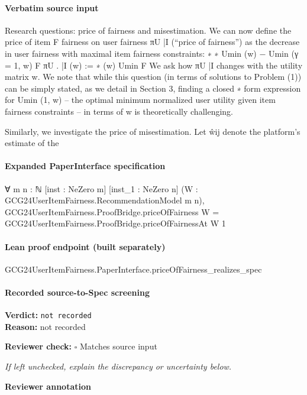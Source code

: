 \documentclass[10pt]{article}
\newcommand{\reviewerbox}{%
  \par\noindent\fbox{\parbox{0.96\linewidth}{\rule{0pt}{0.38in}}}\par
}
\newcommand{\reviewmatch}[1]{%
  \par\noindent\textbf{Reviewer check:} $\square$\; #1\par
  \noindent\emph{If left unchecked, explain the discrepancy or uncertainty below.}\par
}
\begin{document}
\paragraph{Verbatim source input}
\begin{ReviewVerbatim}
Research questions: price of fairness and misestimation. We can now define the price of item
F
fairness on user fairness πU
|I (“price of fairness”) as the decrease in user fairness with maximal item
fairness constraints:
∗
∗
Umin
(w) − Umin
(γ = 1, w)
F
πU
.
|I (w) :=
∗ (w)
Umin
F
We ask how πU
|I changes with the utility matrix w. We note that while this question (in terms
of solutions to Problem (1)) can be simply stated, as we detail in Section 3, finding a closed
∗
form expression for Umin
(1, w) – the optimal minimum normalized user utility given item fairness
constraints – in terms of w is theoretically challenging.

Similarly, we investigate the price of misestimation. Let ŵij denote the platform’s estimate of the
\end{ReviewVerbatim}


\paragraph{Expanded PaperInterface specification}
\begin{ReviewVerbatim}
∀ {m n : ℕ} [inst : NeZero m] [inst_1 : NeZero n] (W : GCG24UserItemFairness.RecommendationModel m n),
  GCG24UserItemFairness.ProofBridge.priceOfFairness W = GCG24UserItemFairness.ProofBridge.priceOfFairnessAt W 1
\end{ReviewVerbatim}

\paragraph{Lean proof endpoint (built separately)}\begin{ReviewVerbatim}
GCG24UserItemFairness.PaperInterface.priceOfFairness_realizes_spec
\end{ReviewVerbatim}

\paragraph{Recorded source-to-Spec screening}
\textbf{Verdict:} \texttt{not recorded}
\\
\textbf{Reason:} not recorded
\reviewmatch{Matches source input}
\noindent\textbf{Reviewer annotation}\par
\reviewerbox
\clearpage
\hypertarget{source-claim-0b68590619af089c}{}
\end{document}
